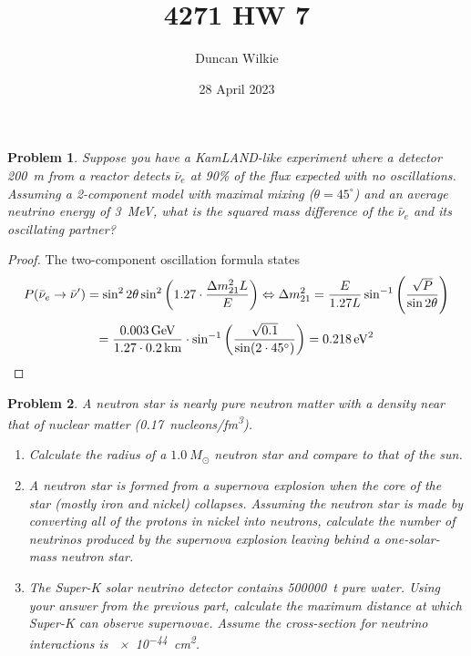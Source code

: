\documentclass{article}
\title{4271 HW 7}
\author{Duncan Wilkie}
\date{28 April 2023}
\newtheorem{plm}{Problem}
\begin{document}
\maketitle

\begin{plm}
  Suppose you have a KamLAND-like experiment where a detector \SI{200}{m} from a reactor detects $\bar{\nu}_e$ at 90\% of the flux expected
  with no oscillations.
  Assuming a 2-component model with maximal mixing ($\theta = 45^{\circ}$) and an average neutrino energy of \SI{3}{MeV},
  what is the squared mass difference of the $\bar{\nu}_{e}$ and its oscillating partner?
\end{plm}

\begin{proof}
  The two-component oscillation formula states
  \[
    P(\bar{\nu}_{e} \to \bar{\nu}') = \sin^{2}2\theta\sin^{2}\qty(1.27 \cdot \frac{\Delta m_{21}^{2}L}{E})
    \Leftrightarrow \Delta m_{21}^{2} = \frac{E}{1.27L}\sin^{-1}\qty(\frac{\sqrt{P}}{\sin 2\theta})
  \]
  \[
    = \frac{\SI{0.003}{GeV}}{1.27 \cdot \SI{0.2}{km}} \cdot \sin^{-1}\qty(\frac{\sqrt{0.1}}{\sin(2 \cdot 45^{\circ})})
    = \SI{0.218}{eV^{2}}
  \]
\end{proof}

\begin{plm}
  A neutron star is nearly pure neutron matter with a density near that of nuclear matter (\SI{0.17}{nucleons/fm^3}).
  \begin{enumerate}
  \item Calculate the radius of a $\SI{1.0}{M_\odot}$ neutron star and compare to that of the sun.
  \item A neutron star is formed from a supernova explosion when the core of the star (mostly iron and nickel) collapses.
    Assuming the neutron star is made by converting all of the protons in nickel into neutrons, calculate the number of neutrinos
    produced by the supernova explosion leaving behind a one-solar-mass neutron star.
  \item The Super-K solar neutrino detector contains \SI{500000}{t} pure water.
    Using your answer from the previous part, calculate the maximum distance at which Super-K can observe supernovae.
    Assume the cross-section for neutrino interactions is \SI{e-44}{cm^2}.
  \end{enumerate}
\end{plm}
\end{document}
